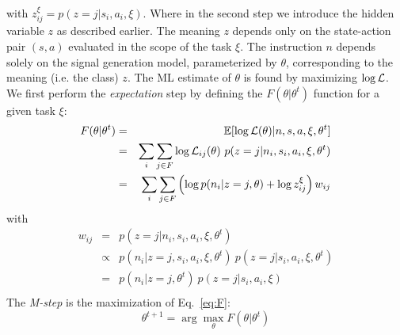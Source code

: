 %
with $z_{ij}^{\xi} = p(z = j|s_i,a_i,\xi)$. Where in the second step we introduce the hidden variable $z$ as described earlier. The meaning $z$ depends only on the state-action pair $(s,a)$ evaluated in the scope of the task $\xi$. The instruction $n$ depends solely on the signal generation model, parameterized by $\theta$, corresponding to the meaning (i.e. the class) $z$. The ML estimate of $\theta$ is found by maximizing $\log{\mathcal{L}}$. We first perform the \textit{expectation} step by defining the $F(\theta|\theta^t)$ function for a given task $\xi$:
%
\begin{eqnarray}
F(\theta|\theta^t) &=& \mathbb{E}[\log{\L(\theta)}| n, s, a, \xi, \theta^t]\nonumber\\
                   &=& \sum_i \sum_{j \in F} \log{\L_{ij}(\theta)}~p(z=j|n_i,s_i,a_i,\xi,\theta^t)\nonumber\\
                   &=& \sum_i \sum_{j \in F} \left(\log{p(n_i|z=j,\theta)}+\log{z_{ij}^{\xi}}\right) w_{ij}
					\label{eq:F}
\end{eqnarray}
%
with
\begin{eqnarray*}
 w_{ij} &=& p(z=j|n_i,s_i,a_i,\xi,\theta^t)\\
        &\propto& p(n_i|z=j,s_i,a_i,\xi,\theta^t)~p(z=j|s_i,a_i,\xi,\theta^t)\\
		&=& p(n_i|z=j,\theta^t)~p(z=j|s_i,a_i,\xi)\\
\end{eqnarray*}
%
The \textit{M-step} is the maximization of Eq.~\ref{eq:F}:
%
\begin{equation}
\theta^{t+1} = \arg\max_{\theta} F(\theta|\theta^t) 
\label{eq:m-step}
\end{equation}
